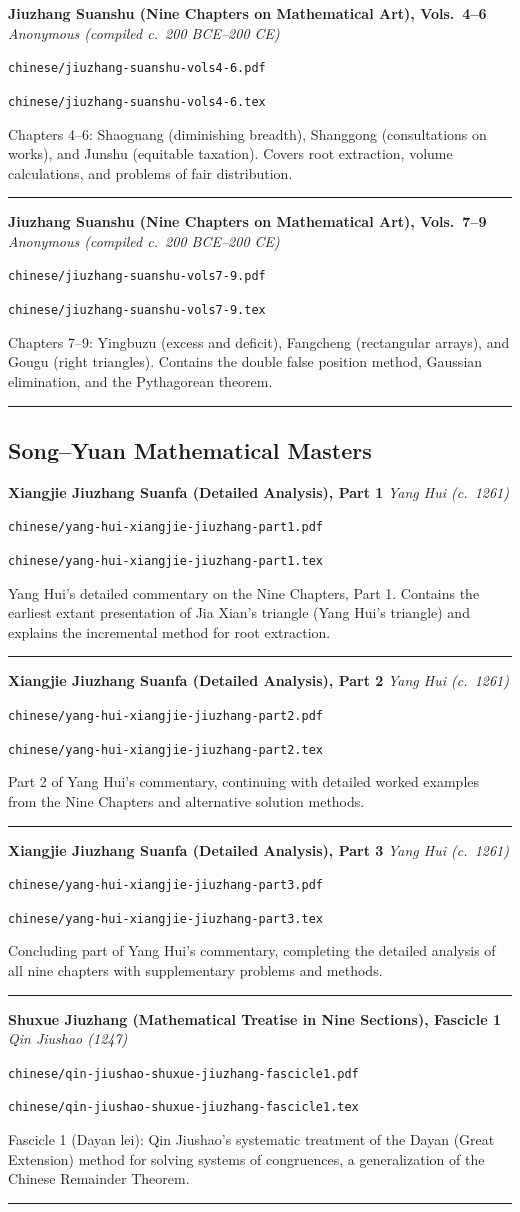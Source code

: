 \documentclass[11pt,a4paper]{article}
\newcommand{\workitem}[5]{%
  \par\smallskip
  \noindent\textbf{\large #1} \hfill \textit{#2}\par
  \noindent\texttt{\small #3}\par
  \noindent\texttt{\small #4}\par
  \noindent #5\par
  \smallskip\noindent\rule{\textwidth}{0.2pt}
}
\begin{document}
\workitem
  {Jiuzhang Suanshu (Nine Chapters on Mathematical Art), Vols.~4--6}
  {Anonymous (compiled c.~200 BCE--200 CE)}
  {chinese/jiuzhang-suanshu-vols4-6.pdf}
  {chinese/jiuzhang-suanshu-vols4-6.tex}
  {Chapters 4--6: Shaoguang (diminishing breadth), Shanggong (consultations on works), and Junshu (equitable taxation). Covers root extraction, volume calculations, and problems of fair distribution.}

\workitem
  {Jiuzhang Suanshu (Nine Chapters on Mathematical Art), Vols.~7--9}
  {Anonymous (compiled c.~200 BCE--200 CE)}
  {chinese/jiuzhang-suanshu-vols7-9.pdf}
  {chinese/jiuzhang-suanshu-vols7-9.tex}
  {Chapters 7--9: Yingbuzu (excess and deficit), Fangcheng (rectangular arrays), and Gougu (right triangles). Contains the double false position method, Gaussian elimination, and the Pythagorean theorem.}

\subsection*{Song--Yuan Mathematical Masters}

\workitem
  {Xiangjie Jiuzhang Suanfa (Detailed Analysis), Part 1}
  {Yang Hui (c.~1261)}
  {chinese/yang-hui-xiangjie-jiuzhang-part1.pdf}
  {chinese/yang-hui-xiangjie-jiuzhang-part1.tex}
  {Yang Hui's detailed commentary on the Nine Chapters, Part 1. Contains the earliest extant presentation of Jia Xian's triangle (Yang Hui's triangle) and explains the incremental method for root extraction.}

\workitem
  {Xiangjie Jiuzhang Suanfa (Detailed Analysis), Part 2}
  {Yang Hui (c.~1261)}
  {chinese/yang-hui-xiangjie-jiuzhang-part2.pdf}
  {chinese/yang-hui-xiangjie-jiuzhang-part2.tex}
  {Part 2 of Yang Hui's commentary, continuing with detailed worked examples from the Nine Chapters and alternative solution methods.}

\workitem
  {Xiangjie Jiuzhang Suanfa (Detailed Analysis), Part 3}
  {Yang Hui (c.~1261)}
  {chinese/yang-hui-xiangjie-jiuzhang-part3.pdf}
  {chinese/yang-hui-xiangjie-jiuzhang-part3.tex}
  {Concluding part of Yang Hui's commentary, completing the detailed analysis of all nine chapters with supplementary problems and methods.}

\workitem
  {Shuxue Jiuzhang (Mathematical Treatise in Nine Sections), Fascicle 1}
  {Qin Jiushao (1247)}
  {chinese/qin-jiushao-shuxue-jiuzhang-fascicle1.pdf}
  {chinese/qin-jiushao-shuxue-jiuzhang-fascicle1.tex}
  {Fascicle 1 (Dayan lei): Qin Jiushao's systematic treatment of the Dayan (Great Extension) method for solving systems of congruences, a generalization of the Chinese Remainder Theorem.}
\end{document}
